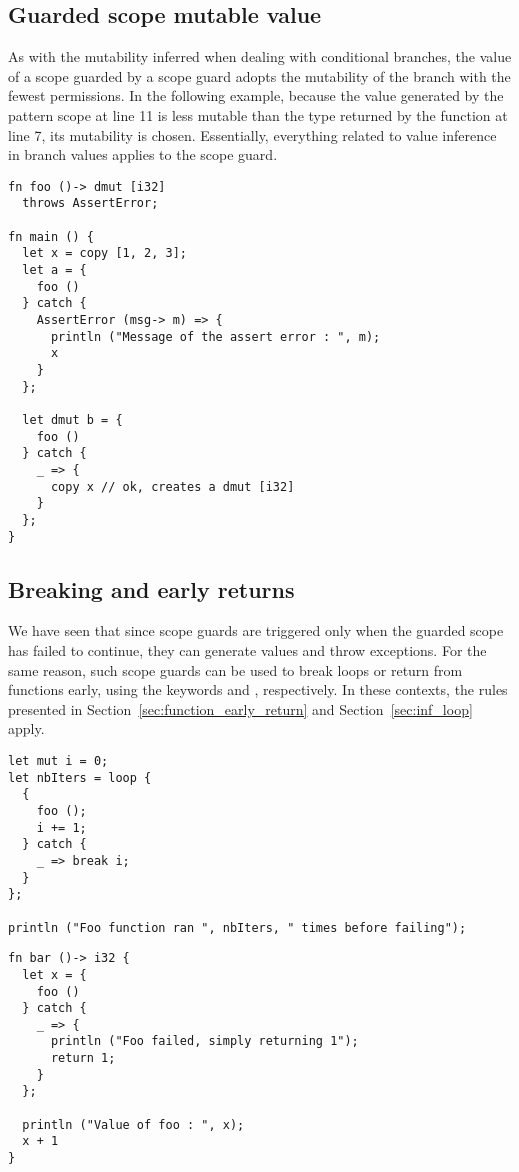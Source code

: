 \subsection{Guarded scope mutable value}

As with the mutability inferred when dealing with conditional branches, the
value of a scope guarded by a  scope guard adopts the mutability of
the branch with the fewest permissions. In the following example, because the
value generated by the  pattern scope at line 11 is less mutable
than the type returned by the function  at line 7, its mutability is
chosen. Essentially, everything related to value inference in branch values
applies to the  scope guard.

\begin{lstlisting}[style=coloredverbatim]
fn foo ()-> dmut [i32]
  throws AssertError;

fn main () {
  let x = copy [1, 2, 3];
  let a = {
    foo ()
  } catch {
    AssertError (msg-> m) => {
      println ("Message of the assert error : ", m);
      x
    }
  };

  let dmut b = {
    foo ()
  } catch {
    _ => {
      copy x // ok, creates a dmut [i32]
    }
  };
}
\end{lstlisting}

\subsection{Breaking and early returns}

We have seen that since  scope guards are triggered only when the
guarded scope has failed to continue, they can generate values and throw
exceptions. For the same reason, such scope guards can be used to break loops or
return from functions early, using the keywords  and
, respectively. In these contexts, the rules presented in
Section~\ref{sec:function_early_return} and Section~\ref{sec:inf_loop} apply.

\begin{lstlisting}[style=coloredverbatim]
let mut i = 0;
let nbIters = loop {
  {
    foo ();
    i += 1;
  } catch {
    _ => break i;
  }
};

println ("Foo function ran ", nbIters, " times before failing");
\end{lstlisting}

\begin{lstlisting}[style=coloredverbatim]
fn bar ()-> i32 {
  let x = {
    foo ()
  } catch {
    _ => {
      println ("Foo failed, simply returning 1");
      return 1;
    }
  };

  println ("Value of foo : ", x);
  x + 1
}
\end{lstlisting}

